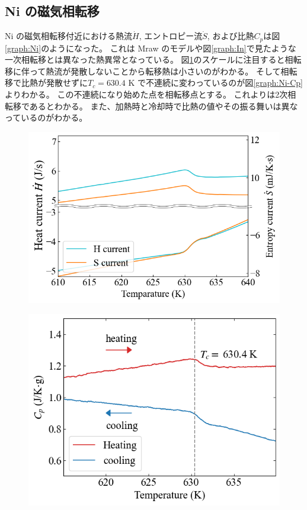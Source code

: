 \documentclass[9pt,dvipdfmx,a4paper]{jsarticle}
\begin{document}
\subsection{Ni の磁気相転移}
Ni の磁気相転移付近における熱流\(\dot{H}\), エントロピー流\(\dot{S}\), および比熱\(C_p\)は図\ref{graph:Ni}のようになった。
これは Mraw のモデルや図\ref{graph:In}で見たような一次相転移とは異なった熱異常となっている。
図\ref{graph:Ni-current}のスケールに注目すると相転移に伴って熱流が発散しないことから転移熱は小さいのがわかる。
そして相転移で比熱が発散せずに\(T_c = 630.4\) K で不連続に変わっているのが図\ref{graph:Ni-Cp}よりわかる。
この不連続になり始めた点を相転移点とする。
これよりは2次相転移であるとわかる。
また、加熱時と冷却時で比熱の値やその振る舞いは異なっているのがわかる。
\begin{figure}[hbt]
    \centering
    \begin{minipage}[t]{0.50\columnwidth}
        \centering
        \includegraphics[width = \columnwidth]{result/Ni-current.png}
        \label{graph:Ni-current}
    \end{minipage}
    \hfill
    \begin{minipage}[t]{0.46\columnwidth}
        \centering
        \includegraphics[width = \columnwidth]{result/Ni-Cp.png}

\end{minipage}
\end{figure}
\end{document}
